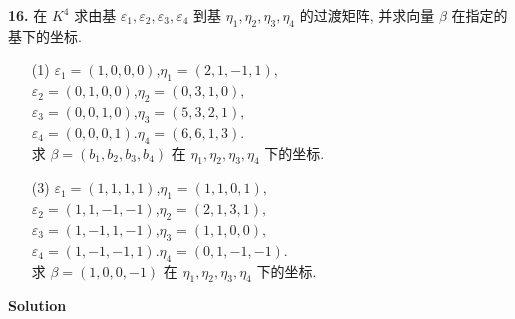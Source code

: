 \documentclass[11pt,a4paper,openany,oneside]{book}
\newcommand\Solution{\noindent\textbf{\textsf{Solution}}\par\medskip}
\begin{document}
\begin{myexample}
\textbf{16.}
在 $ K^4 $ 求由基 $ \varepsilon_1, \varepsilon_2, \varepsilon_3, \varepsilon_4 $ 到基 $ \eta_1, \eta_2, \eta_3, \eta_4 $ 的过渡矩阵, 并求向量 $ \beta $ 在指定的基下的坐标. 
\begin{enumerate}

\item[(1)]  
	$\varepsilon_1 = (1, 0, 0, 0)$,\hspace{1.2em}$ \eta_1 = (2, 1, -1, 1),$\\ 
	$\varepsilon_2 = (0, 1, 0, 0)$,\hspace{1.2em}$ \eta_2 = (0, 3, 1, 0), $\\ 
	$\varepsilon_3 = (0, 0, 1, 0)$,\hspace{1.2em}$ \eta_3 = (5, 3, 2, 1), $\\  
	$\varepsilon_4 = (0 ,0, 0, 1)$.\hspace{1.2em}$ \eta_4 = (6 ,6, 1, 3). $\\ 
求 $ \beta = (b_1, b_2, b_3, b_4) $ 在 $ \eta_1, \eta_2, \eta_3, \eta_4 $ 下的坐标.

\item[(3)]
	$\varepsilon_1 = (1, 1, 1, 1)$,\hspace{2.7em}$ \eta_1 = (1, 1, 0, 1),$\\ 
    $\varepsilon_2 = (1, 1, -1, -1)$,\hspace{1.2em}$ \eta_2 = (2, 1, 3, 1), $\\ 
    $\varepsilon_3 = (1, -1, 1, -1)$,\hspace{1.2em}$ \eta_3 = (1, 1, 0, 0), $\\  
    $\varepsilon_4 = (1 ,-1, -1, 1)$.\hspace{1.2em}$ \eta_4 = (0 ,1, -1, -1). $\\ 
求 $ \beta = (1, 0, 0, -1) $ 在 $ \eta_1, \eta_2, \eta_3, \eta_4 $ 下的坐标. \\
\end{enumerate}

\end{myexample}
\Solution
\end{document}
